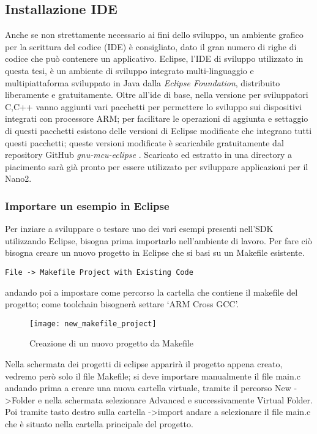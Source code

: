 \subsection{Installazione IDE}
Anche se non strettamente necessario ai fini dello sviluppo, un ambiente grafico per la scrittura del codice (IDE) è consigliato, dato il gran numero di righe di codice che può contenere un applicativo. Eclipse, l'IDE di sviluppo utilizzato in questa tesi, è un ambiente di sviluppo integrato multi-linguaggio e multipiattaforma sviluppato in Java dalla \emph{Eclipse Foundation}, distribuito liberamente e gratuitamente.
Oltre all'ide di base, nella versione per sviluppatori C,C++ vanno aggiunti vari pacchetti per permettere lo sviluppo sui dispositivi integrati con processore ARM; per facilitare le operazioni di aggiunta e settaggio di questi pacchetti esistono delle versioni di Eclipse modificate che integrano tutti questi pacchetti; queste versioni modificate è scaricabile gratuitamente dal repository GitHub \emph{gnu-mcu-eclipse} \cite{gnueclipseweb}. Scaricato ed estratto in una directory a piacimento sarà già pronto per essere utilizzato per sviluppare applicazioni per il Nano2.
\subsubsection{Importare un esempio in Eclipse}
Per inziare a sviluppare o testare uno dei vari esempi presenti nell'SDK utilizzando Eclipse, bisogna prima importarlo nell'ambiente di lavoro. 
Per fare ciò bisogna creare un nuovo progetto in Eclipse che si basi su un Makefile esistente.

\begin{verbatim}
File -> Makefile Project with Existing Code
\end{verbatim}
andando poi a impostare come percorso la cartella che contiene il makefile del progetto; come toolchain bisognerà settare \lq ARM Cross GCC\rq .

\begin{figure}[H]
\texttt{[image: new\_makefile\_project]}
\centering
\caption{Creazione di un nuovo progetto da Makefile}
\label{makefile_proj}
\end{figure}

Nella schermata dei progetti di eclipse apparirà il progetto appena creato, vedremo però solo il file Makefile; si deve importare manualmente il file main.c andando prima a creare una nuova cartella virtuale, tramite il percorso New -\textgreater  Folder e nella schermata selezionare Advanced e successivamente Virtual Folder. Poi tramite tasto destro sulla cartella -\textgreater  import andare a selezionare il file main.c che è situato nella cartella principale del progetto.

